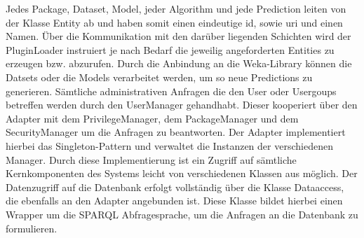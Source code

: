 Jedes Package, Dataset, Model, jeder Algorithm und jede Prediction leiten von der Klasse Entity ab und haben somit einen eindeutige id, sowie uri und einen Namen. Über die Kommunikation mit den darüber liegenden Schichten wird der PluginLoader instruiert je nach Bedarf die jeweilig angeforderten Entities zu erzeugen bzw. abzurufen. Durch die Anbindung an die Weka-Library können die Datsets oder die Models verarbeitet werden, um so neue Predictions zu generieren.
Sämtliche administrativen Anfragen die den User oder Usergoups betreffen werden durch den UserManager gehandhabt. Dieser kooperiert über den Adapter mit dem PrivilegeManager, dem PackageManager und dem SecurityManager um die Anfragen zu beantworten. Der Adapter implementiert hierbei das Singleton-Pattern und verwaltet die Instanzen der verschiedenen Manager. Durch diese Implementierung ist ein Zugriff auf sämtliche Kernkomponenten des Systems leicht von verschiedenen Klassen aus möglich. 
Der Datenzugriff auf die Datenbank erfolgt vollständig über die Klasse Dataaccess, die ebenfalls an den Adapter angebunden ist. Diese Klasse bildet hierbei einen Wrapper um die SPARQL Abfragesprache, um die Anfragen an die Datenbank zu formulieren.